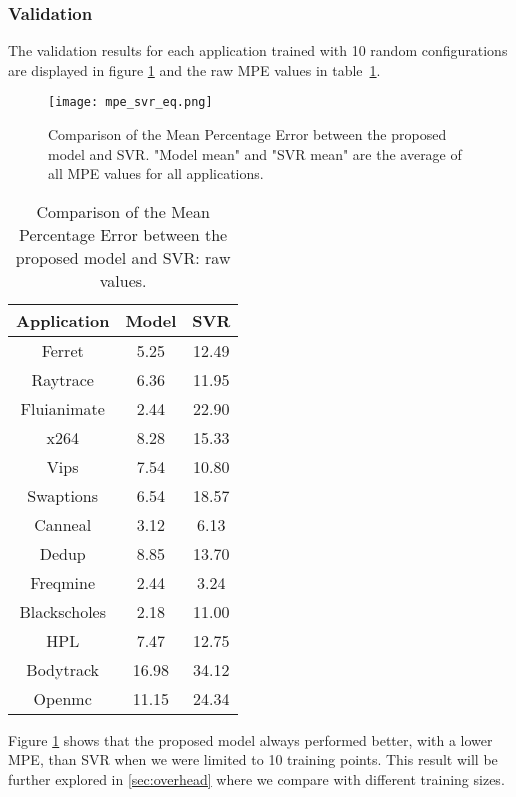 \documentclass{ieeeaccess}
\begin{document}
\subsubsection{Validation}
The validation results for each application trained with 10 random configurations are displayed in figure \ref{fig:mpe_svr_eq} and the raw MPE values in  table~\ref{tab:mpe_svr_eq}.
\begin{figure}[htb!]
	\texttt{[image: mpe\_svr\_eq.png]}
	\caption{Comparison of the Mean Percentage Error between the proposed model and SVR. "Model mean" and "SVR mean" are the average of all MPE values for all applications.
	}
	\label{fig:mpe_svr_eq}
\end{figure}
\begin{table}[htb!]
\centering
\begin{tabular}{|c|c|c|}
\hline
Application  & Model & SVR   \\ \hline
Ferret       & 5.25     & 12.49  \\ \hline
Raytrace     & 6.36     & 11.95  \\ \hline
Fluianimate  & 2.44     & 22.90  \\ \hline
x264         & 8.28     & 15.33  \\ \hline
Vips         & 7.54     & 10.80  \\ \hline
Swaptions    & 6.54     & 18.57  \\ \hline
Canneal      & 3.12     & 6.13   \\ \hline
Dedup        & 8.85     & 13.70  \\ \hline
Freqmine     & 2.44     & 3.24   \\ \hline
Blackscholes & 2.18     & 11.00  \\ \hline
HPL          & 7.47     & 12.75  \\ \hline
Bodytrack    & 16.98    & 34.12  \\ \hline
Openmc       & 11.15    & 24.34  \\ \hline
\end{tabular}
\caption{Comparison of the Mean Percentage Error between the proposed model and SVR: raw values.}
\label{tab:mpe_svr_eq}
\end{table}

Figure \ref{fig:mpe_svr_eq} shows that the proposed model always performed better, with a lower MPE, than SVR when we were limited to 10 training points. This result will be further explored in \cref{sec:overhead} where we compare with different training sizes.
\end{document}
